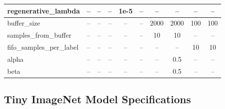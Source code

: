 \documentclass{article}
\begin{document}
\begin{table}[!ht]
\begin{tabular}{lccccccccc}
regenerative\_lambda& --   & --    & --   & 1e-5 & --  & --   & --   & --   & --   \\
\midrule
buffer\_size        & --   & --    & --   & --   & --   & 2000 & 2000 & 100  & 100  \\
samples\_from\_buffer & -- & --    & --   & --   & --   & 10   & 10   & --   & --   \\
fifo\_samples\_per\_label & -- & -- & --  & --   & --   & --   & --   & 10   & 10   \\
\midrule
alpha               & --   & --    & --   & --   & --   & --   & 0.5  & --   & --   \\
beta                & --   & --    & --   & --   & --   & --   & 0.5  & --   & --   \\
\bottomrule
\end{tabular}

\end{table}

\subsection{Tiny ImageNet Model Specifications}
\label{sec:tiny_model_specs}
\end{document}
